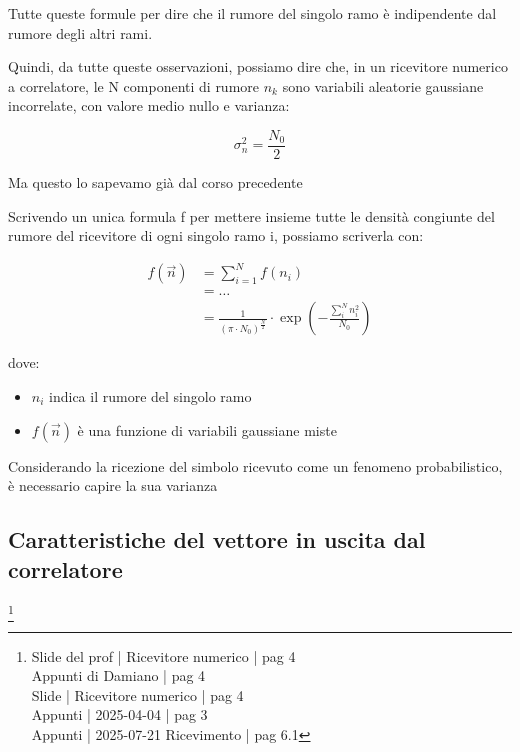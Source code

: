 \begin{tcolorbox}
Tutte queste formule per dire che il rumore del singolo ramo è indipendente dal rumore degli altri rami.      
\end{tcolorbox}

Quindi, da tutte queste osservazioni, possiamo dire che, 
in un ricevitore numerico a correlatore, 
le N componenti di rumore ${n_k}$ sono variabili aleatorie gaussiane incorrelate, 
con valore medio nullo e varianza: 

{
    \Large 
    \begin{equation}
        \sigma_n^{2} = \frac{N_0}{2}
    \end{equation}
}


\begin{tcolorbox}
    Ma questo lo sapevamo già dal corso precedente
\end{tcolorbox}

Scrivendo un unica formula f per mettere insieme tutte le densità congiunte del rumore del ricevitore
di ogni singolo ramo i, possiamo scriverla con: 

{
    \Large 
    \begin{equation}
        \begin{split}
            f(\overrightarrow{n})
            &= 
            \sum_{i = 1}^{N}
            f(n_i)
            \\
            &= 
            \dots
            \\
            &= 
            \frac{1}{(\pi \cdot N_0)^{\frac{N}{2}}}
            \cdot 
            \exp(- \frac{\sum_{i}^{N} n_i ^{2}}{N_0})
        \end{split}
    \end{equation}
}

dove: 

\begin{itemize}
    \item $n_i$ indica il rumore del singolo ramo 
    \item $f(\overrightarrow{n})$ è una funzione di variabili gaussiane miste 
\end{itemize}

\begin{tcolorbox}
Considerando la ricezione del simbolo ricevuto come un fenomeno probabilistico, è necessario capire la sua varianza
\end{tcolorbox}

\newpage

\subsection{Caratteristiche del vettore in uscita dal correlatore}
\footnote{Slide del prof | Ricevitore numerico | pag 4 \\  
Appunti di Damiano | pag 4 \\
Slide | Ricevitore numerico | pag 4 \\
Appunti | 2025-04-04 | pag 3 \\
Appunti | 2025-07-21 Ricevimento | pag 6.1 
}

